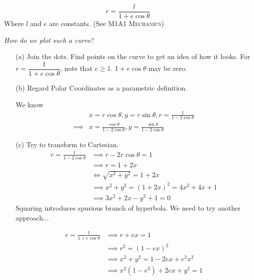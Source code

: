 \documentclass[10pt]{scrartcl}
\begin{document}
\begin{example}
\[r = \frac{l}{1 + e\cos\theta}\]	
Where $l$ and $e$ are constants. (See \textsc{M1A1 Mechanics}) 

\emph{How do we plot such a curve}?

\begin{itemize}
  \item[(a)] Join the dots. Find points on the curve to get an idea of how it looks. For $r = \dfrac{1}{1 + e\cos\theta}$, note that $e \geq1$. $1 + e\cos\theta$ may be zero. 
 \begin{center}
\end{center}
  
  
  \item[(b)] Regard Polar Coordinates as a parametric definition.

	We know
\[\begin{aligned}
	&x = r\cos\theta, y = r\sin\theta, r = \frac{1}{1-2\cos\theta}  \\[0.2cm]
\implies &x = \frac{\cos\theta}{1-2\cos\theta}, y= \frac{\sin\theta}{1-2\cos\theta}
\end{aligned}\] 
	
\item[(c)] Try to transform to Cartesian.
\[
\begin{aligned}
    r = \frac{1}{1-2\cos\theta} &\implies r - 2r\cos\theta = 1\\
    &\implies r = 1 + 2x\\
    &\iff \sqrt{x^2 + y^2} = 1+2x\\
    &\implies x^2 + y^2 = (1+2x)^2 = 4x^2 + 4x + 1\\
    &\implies 3x^2 + 2x - y^2 + 1 = 0
\end{aligned}
\]
Squaring introduces spurious branch of hyperbola. We need to try another approach...

\[
\begin{aligned}
  r = \frac{1}{1 + e\cos\theta} &\implies r + ex = 1\\
  &\implies r^2 = (1-ex)^2\\
  &\implies x^2 + y^2 = 1-2ex + e^2x^2\\
  &\implies x^2(1-e^2) + 2ex + y^2 = 1
\end{aligned}
\]


\end{itemize}
\end{example}
\end{document}
